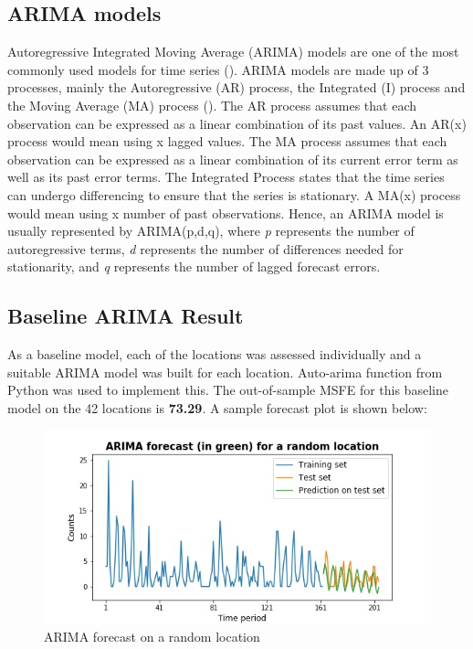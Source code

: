 \documentclass[12pt, letterpaper] {article}
\begin{document}
\subsection{ARIMA models}
Autoregressive Integrated Moving Average (ARIMA) models are one of the most commonly used models for time series (\cite{Asha2016}). ARIMA models are made up of 3 processes, mainly the Autoregressive (AR) process, the Integrated (I) process and the Moving Average (MA) process (\cite{Jamal2018}). The AR process assumes that each observation can be expressed as a linear combination of its past values.  An AR(x) process would mean using x lagged values. The MA process assumes that each observation can be expressed as a linear combination of its current error term as well as its past error terms. The Integrated Process states that the time series can undergo differencing to ensure that the series is stationary. A MA(x) process would mean using x number of past observations. Hence, an ARIMA model is usually represented by ARIMA(p,d,q), where \textit{p} represents the number of autoregressive terms, \textit{d} represents the number of differences needed for stationarity, and \textit{q} represents the number of lagged forecast errors. 

\subsection{Baseline ARIMA Result}
As a baseline model, each of the locations was assessed individually and a suitable ARIMA model was built for each location. Auto-arima function from Python was used to implement this. The out-of-sample MSFE for this baseline model on the 42 locations is \textbf{73.29}. A sample forecast plot is shown below:

\begin{figure}[H]
    \centering
    \includegraphics[width=\textwidth]{Images/forecast_example.jpg}
    \caption{ARIMA forecast on a random location}
    \label{fig:ARIMA forecast on a random location}
\end{figure}
\end{document}
